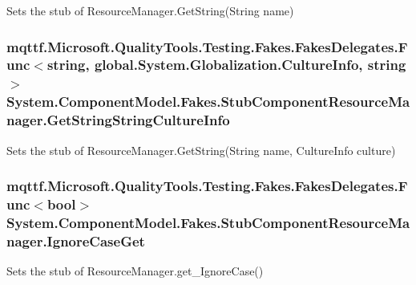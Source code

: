 Sets the stub of Resource\-Manager.\-Get\-String(\-String name)

\hypertarget{class_system_1_1_component_model_1_1_fakes_1_1_stub_component_resource_manager_afbc367f76816439c3ac22f28257ad841}{
\subsubsection[{Get\-String\-String\-Culture\-Info}]{\setlength{\rightskip}{0pt plus 5cm}mqttf.\-Microsoft.\-Quality\-Tools.\-Testing.\-Fakes.\-Fakes\-Delegates.\-Func$<$string, global.\-System.\-Globalization.\-Culture\-Info, string$>$ System.\-Component\-Model.\-Fakes.\-Stub\-Component\-Resource\-Manager.\-Get\-String\-String\-Culture\-Info}}\label{class_system_1_1_component_model_1_1_fakes_1_1_stub_component_resource_manager_afbc367f76816439c3ac22f28257ad841}


Sets the stub of Resource\-Manager.\-Get\-String(\-String name, Culture\-Info culture)

\hypertarget{class_system_1_1_component_model_1_1_fakes_1_1_stub_component_resource_manager_a9f71449ba5921fc079fe94194b83a237}{
\subsubsection[{Ignore\-Case\-Get}]{\setlength{\rightskip}{0pt plus 5cm}mqttf.\-Microsoft.\-Quality\-Tools.\-Testing.\-Fakes.\-Fakes\-Delegates.\-Func$<$bool$>$ System.\-Component\-Model.\-Fakes.\-Stub\-Component\-Resource\-Manager.\-Ignore\-Case\-Get}}\label{class_system_1_1_component_model_1_1_fakes_1_1_stub_component_resource_manager_a9f71449ba5921fc079fe94194b83a237}


Sets the stub of Resource\-Manager.\-get\-\_\-\-Ignore\-Case()

